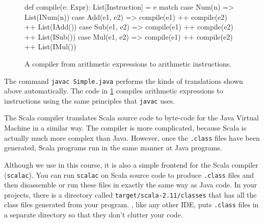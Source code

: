 \begin{figure}
\begin{scalacode}
def compile(e: Expr): List[Instruction] = e match {
  case Num(n) => List(INum(n))
  case Add(e1, e2) => compile(e1) ++ compile(e2) ++ List(IAdd())
  case Sub(e1, e2) => compile(e1) ++ compile(e2) ++ List(ISub())
  case Mul(e1, e2) => compile(e1) ++ compile(e2) ++ List(IMul())
}
\end{scalacode}
\caption{A compiler from arithmetic expressions to arithmetic instructions.}
\label{arithcompiler}
\end{figure}

The command \verb|javac Simple.java| performs the kinds of translations shown
above automatically. The code in \cref{arithcompiler} compiles arithmetic expressions
to instructions using the same principles that \verb|javac| uses.

The Scala compiler translates Scala source code to byte-code for the Java Virtual Machine
in a similar way. The compiler is more complicated, because Scala is actually much more
complex than Java. However, once the \verb|.class| files have been generated, Scala
programs run in the same manner at Java programs.

Although we use \sbt{} in this course, it is also a simple frontend
for the Scala compiler (\verb|scalac|). You can run \verb|scalac| on
Scala source code to produce \verb|.class| files and then disassemble
or run these files in exactly the same way as Java code. In your
\sbt{} projects, there is a directory called
\verb|target/scala-2.11/classes| that has all the class files
generated from your program. \sbt{}, like any other IDE, puts
\verb|.class| files in a separate directory so that they don't clutter
your code.
